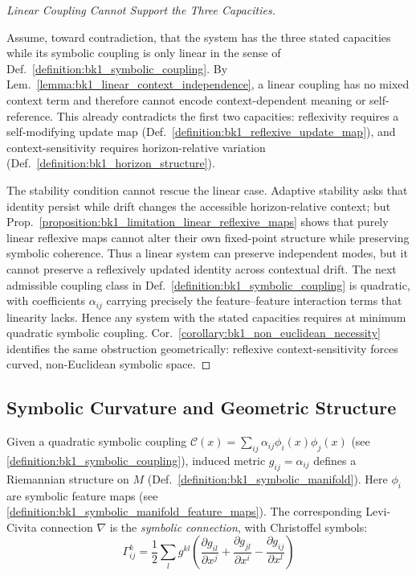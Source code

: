\begin{proof}[Linear Coupling Cannot Support the Three Capacities]
\label{proof:bk1_minimal_quadratic_sufficiency}
\leavevmode

Assume, toward contradiction, that the system has the three stated capacities
while its symbolic coupling is only linear in the sense of
Def.~\ref{definition:bk1_symbolic_coupling}. By
Lem.~\ref{lemma:bk1_linear_context_independence}, a linear coupling has no mixed
context term and therefore cannot encode context-dependent meaning or
self-reference. This already contradicts the first two capacities: reflexivity
requires a self-modifying update map (Def.~\ref{definition:bk1_reflexive_update_map}),
and context-sensitivity requires horizon-relative variation
(Def.~\ref{definition:bk1_horizon_structure}).

The stability condition cannot rescue the linear case. Adaptive stability asks
that identity persist while drift changes the accessible horizon-relative
context; but Prop.~\ref{proposition:bk1_limitation_linear_reflexive_maps} shows
that purely linear reflexive maps cannot alter their own fixed-point structure
while preserving symbolic coherence. Thus a linear system can preserve
independent modes, but it cannot preserve a reflexively updated identity across
contextual drift. The next admissible coupling class in
Def.~\ref{definition:bk1_symbolic_coupling} is quadratic, with coefficients
\(\alpha_{ij}\) carrying precisely the feature--feature interaction terms that
linearity lacks. Hence any system with the stated capacities requires at minimum
quadratic symbolic coupling. Cor.~\ref{corollary:bk1_non_euclidean_necessity}
identifies the same obstruction geometrically: reflexive context-sensitivity
forces curved, non-Euclidean symbolic space.
\end{proof}

\subsection{Symbolic Curvature and Geometric Structure}
\label{subsec:bk1_symbolic_curvature_and_geometric_structure}

\begin{definition}
\label{definition:bk1_symbolic_connection}
\leavevmode\newline
Given a quadratic symbolic coupling
$\mathcal{C}(x) = \sum_{ij} \alpha_{ij} \phi_i(x)\phi_j(x)$
(see \ref{definition:bk1_symbolic_coupling}), induced metric
$g_{ij} = \alpha_{ij}$ defines a Riemannian structure on $M$
(Def.~\ref{definition:bk1_symbolic_manifold}).
Here $\phi_i$ are symbolic feature maps
(see \ref{definition:bk1_symbolic_manifold_feature_maps}).
The corresponding Levi-Civita connection $\nabla$ is the
\emph{symbolic connection}, with Christoffel symbols:
\[
\Gamma^k_{ij} = \frac{1}{2} \sum_l g^{kl} \left( \frac{\partial g_{il}}{\partial x^j} + \frac{\partial g_{jl}}{\partial x^i} - \frac{\partial g_{ij}}{\partial x^l} \right)
\]
\end{definition}

